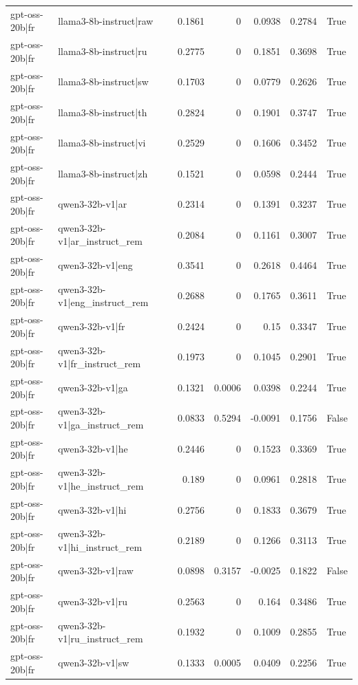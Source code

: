 \begin{table}
\begin{tabular}{l l r r r r l}
gpt-oss-20b|fr & llama3-8b-instruct|raw & 0.1861 & 0 & 0.0938 & 0.2784 & True \\
gpt-oss-20b|fr & llama3-8b-instruct|ru & 0.2775 & 0 & 0.1851 & 0.3698 & True \\
gpt-oss-20b|fr & llama3-8b-instruct|sw & 0.1703 & 0 & 0.0779 & 0.2626 & True \\
gpt-oss-20b|fr & llama3-8b-instruct|th & 0.2824 & 0 & 0.1901 & 0.3747 & True \\
gpt-oss-20b|fr & llama3-8b-instruct|vi & 0.2529 & 0 & 0.1606 & 0.3452 & True \\
gpt-oss-20b|fr & llama3-8b-instruct|zh & 0.1521 & 0 & 0.0598 & 0.2444 & True \\
gpt-oss-20b|fr & qwen3-32b-v1|ar & 0.2314 & 0 & 0.1391 & 0.3237 & True \\
gpt-oss-20b|fr & qwen3-32b-v1|ar_instruct_rem & 0.2084 & 0 & 0.1161 & 0.3007 & True \\
gpt-oss-20b|fr & qwen3-32b-v1|eng & 0.3541 & 0 & 0.2618 & 0.4464 & True \\
gpt-oss-20b|fr & qwen3-32b-v1|eng_instruct_rem & 0.2688 & 0 & 0.1765 & 0.3611 & True \\
gpt-oss-20b|fr & qwen3-32b-v1|fr & 0.2424 & 0 & 0.15 & 0.3347 & True \\
gpt-oss-20b|fr & qwen3-32b-v1|fr_instruct_rem & 0.1973 & 0 & 0.1045 & 0.2901 & True \\
gpt-oss-20b|fr & qwen3-32b-v1|ga & 0.1321 & 0.0006 & 0.0398 & 0.2244 & True \\
gpt-oss-20b|fr & qwen3-32b-v1|ga_instruct_rem & 0.0833 & 0.5294 & -0.0091 & 0.1756 & False \\
gpt-oss-20b|fr & qwen3-32b-v1|he & 0.2446 & 0 & 0.1523 & 0.3369 & True \\
gpt-oss-20b|fr & qwen3-32b-v1|he_instruct_rem & 0.189 & 0 & 0.0961 & 0.2818 & True \\
gpt-oss-20b|fr & qwen3-32b-v1|hi & 0.2756 & 0 & 0.1833 & 0.3679 & True \\
gpt-oss-20b|fr & qwen3-32b-v1|hi_instruct_rem & 0.2189 & 0 & 0.1266 & 0.3113 & True \\
gpt-oss-20b|fr & qwen3-32b-v1|raw & 0.0898 & 0.3157 & -0.0025 & 0.1822 & False \\
gpt-oss-20b|fr & qwen3-32b-v1|ru & 0.2563 & 0 & 0.164 & 0.3486 & True \\
gpt-oss-20b|fr & qwen3-32b-v1|ru_instruct_rem & 0.1932 & 0 & 0.1009 & 0.2855 & True \\
gpt-oss-20b|fr & qwen3-32b-v1|sw & 0.1333 & 0.0005 & 0.0409 & 0.2256 & True \\

\end{tabular}
\end{table}
